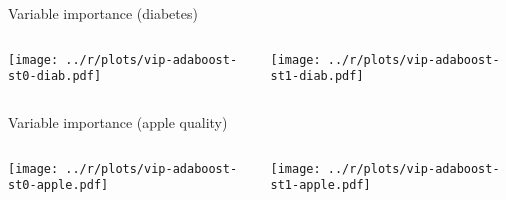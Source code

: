 \begin{frame}{Variable importance (diabetes)}

\begin{columns}[T]
\hspace{-2.5em}\begin{column}{0.515\textwidth}
	\texttt{[image: ../r/plots/vip-adaboost-st0-diab.pdf]}
\end{column}
\hspace{-1.3ex}\begin{column}{0.515\textwidth}
	\texttt{[image: ../r/plots/vip-adaboost-st1-diab.pdf]}
\end{column}
\end{columns}

\end{frame}

\begin{frame}{Variable importance (apple quality)}

\begin{columns}[T]
\hspace{-2.5em}\begin{column}{0.515\textwidth}
	\texttt{[image: ../r/plots/vip-adaboost-st0-apple.pdf]}
\end{column}
\hspace{-1.3ex}\begin{column}{0.515\textwidth}
	\texttt{[image: ../r/plots/vip-adaboost-st1-apple.pdf]}
\end{column}
\end{columns}

\end{frame}

%
%	
%
%
%
%

